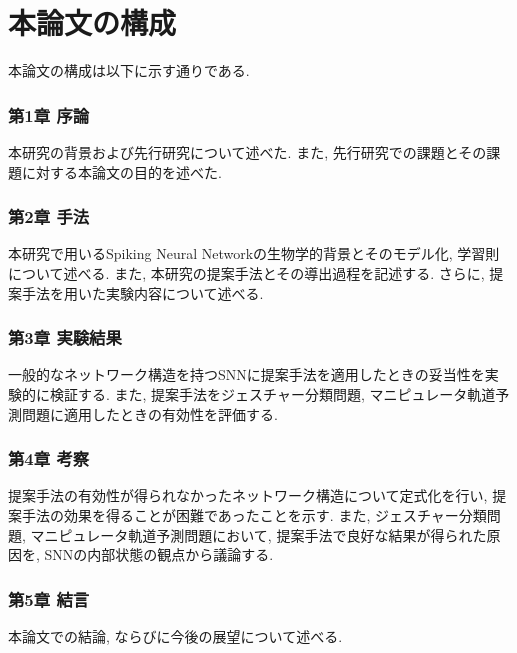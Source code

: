 \section{本論文の構成}
本論文の構成は以下に示す通りである.

\subsubsection{第1章 序論}
本研究の背景および先行研究について述べた.
また, 先行研究での課題とその課題に対する本論文の目的を述べた.

\subsubsection{第2章 手法}
本研究で用いるSpiking Neural Networkの生物学的背景とそのモデル化, 学習則について述べる.
また, 本研究の提案手法とその導出過程を記述する.
さらに, 提案手法を用いた実験内容について述べる.

\subsubsection{第3章 実験結果}
一般的なネットワーク構造を持つSNNに提案手法を適用したときの妥当性を実験的に検証する.
また, 提案手法をジェスチャー分類問題, マニピュレータ軌道予測問題に適用したときの有効性を評価する.

\subsubsection{第4章 考察}
提案手法の有効性が得られなかったネットワーク構造について定式化を行い, 提案手法の効果を得ることが困難であったことを示す.
また, ジェスチャー分類問題, マニピュレータ軌道予測問題において, 提案手法で良好な結果が得られた原因を, SNNの内部状態の観点から議論する.

\subsubsection{第5章 結言}
本論文での結論, ならびに今後の展望について述べる.
